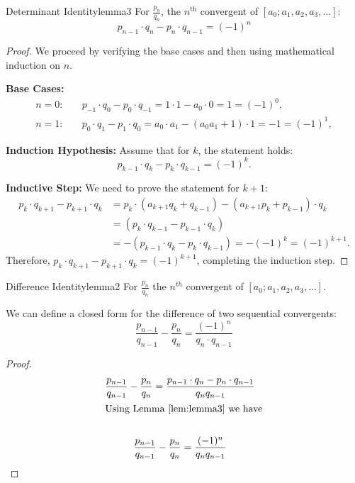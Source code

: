 \documentclass[a4paper]{article}
\begin{document}
\begin{mylemma}{Determinant Identity}{lemma3}
  For $\frac{p_{n}}{q_n}$, the $n^{\text{th}}$ convergent of $[a_0; a_1, a_2, a_3, \dots]$:
  \[
    p_{n-1} \cdot q_n - p_{n} \cdot q_{n-1} = (-1)^n
  \]
  \begin{proof}
    We proceed by verifying the base cases and then using mathematical induction on \( n \).

    \textbf{Base Cases:}
    \begin{align*}
      n = 0: \quad & p_{-1} \cdot q_0 - p_{0} \cdot q_{-1} = 1 \cdot 1 - a_0 \cdot 0 = 1 = (-1)^0,              \\
      n = 1: \quad & p_{0} \cdot q_1 - p_{1} \cdot q_{0} = a_0 \cdot a_1 - (a_0 a_1 + 1) \cdot 1 = -1 = (-1)^1,
    \end{align*}

    \textbf{Induction Hypothesis:} Assume that for \( k \), the statement holds:
    \[
      p_{k-1} \cdot q_k - p_{k} \cdot q_{k-1} = (-1)^k.
    \]

    \textbf{Inductive Step:} We need to prove the statement for \( k+1 \):
    \begin{align*}
      p_{k} \cdot q_{k+1} - p_{k+1} \cdot q_{k} & = p_{k} \cdot (a_{k+1} q_{k} + q_{k-1}) - (a_{k+1} p_{k} + p_{k-1}) \cdot q_{k} \\
                                                & = \left( p_{k} \cdot q_{k-1} - p_{k-1} \cdot q_{k} \right)                      \\
                                                & = - (p_{k-1} \cdot q_k - p_{k} \cdot q_{k-1}) = -(-1)^k = (-1)^{k+1}.
    \end{align*}
    Therefore, \( p_{k} \cdot q_{k+1} - p_{k+1} \cdot q_{k} = (-1)^{k+1} \), completing the induction step.
  \end{proof}
\end{mylemma}

\begin{mylemma}{Difference Identity}{lemma2}
  For $\frac{p_{n}}{q_n}$ the $n^{th}$ convergent of $[a_0; a_1, a_2, a_3, \dots]$.

  We can define a closed form for the difference of two sequential convergents:
  \[
    \frac{p_{n-1}}{q_{n-1}} - \frac{p_{n}}{q_n} = \frac{(-1)^n}{q_n \cdot q_{n-1}}
  \]

  \begin{proof}
    \begin{gather*}
      \frac{p_{n-1}}{q_{n-1}} - \frac{p_{n}}{q_n}
      = \frac{p_{n-1} \cdot q_n - p_{n} \cdot q_{n-1}}{q_{n} q_{n-1}}  \\
      \shortintertext{Using Lemma~\ref{lem:lemma3} we have} \\
      \frac{p_{n-1}}{q_{n-1}} - \frac{p_{n}}{q_n} = \frac{(-1)^n}{q_{n} q_{n-1}}
    \end{gather*}
  \end{proof}
\end{mylemma}
\end{document}
